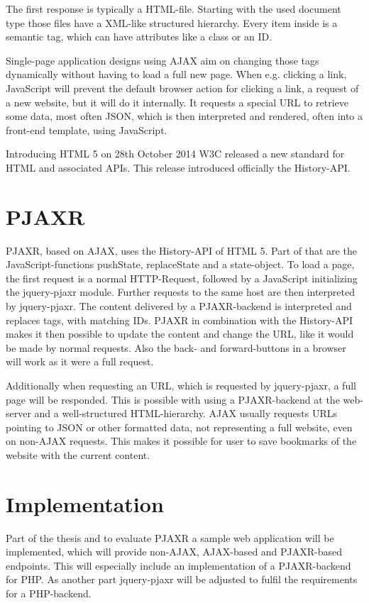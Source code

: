 \documentclass[f,bachelor,binding,twoside,palatino]{WeSTthesis}
\begin{document}
  The first response is typically a HTML-file.
  Starting with the used document type those files have a XML-like structured hierarchy.
  Every item inside is a semantic tag, which can have attributes like a class or an ID.

  Single-page application designs using AJAX aim on changing those tags dynamically without having to load a full new page.
  When e.g. clicking a link, JavaScript will prevent the default browser action for clicking a link, a request of a new website, but it will do it internally.
  It requests a special URL to retrieve some data, most often JSON, which is then interpreted and rendered, often into a front-end template, using JavaScript.

  Introducing HTML 5 on 28th October 2014 W3C released a new standard for HTML and associated APIs. 
  This release introduced officially the History-API.
  
\section{PJAXR}
  PJAXR, based on AJAX, uses the History-API of HTML 5.
  Part of that are the JavaScript-functions pushState, replaceState and a state-object.
  To load a page, the first request is a normal HTTP-Request, followed by a JavaScript initializing the jquery-pjaxr module.
  Further requests to the same host are then interpreted by jquery-pjaxr.
  The content delivered by a PJAXR-backend is interpreted and replaces tags, with matching IDs.
  PJAXR in combination with the History-API makes it then possible to update the content and change the URL, like it would be made by normal requests.
  Also the back- and forward-buttons in a browser will work as it were a full request.
  
  Additionally when requesting an URL, which is requested by jquery-pjaxr, a full page will be responded.
  This is possible with using a PJAXR-backend at the web-server and a well-structured HTML-hierarchy.
  AJAX usually requests URLs pointing to JSON or other formatted data, not representing a full website, even on non-AJAX requests.
  This makes it possible for user to save bookmarks of the website with the current content.

\section{Implementation}
  Part of the thesis and to evaluate PJAXR a sample web application will be implemented, which will provide non-AJAX, AJAX-based and PJAXR-based endpoints.
  This will especially include an implementation of a PJAXR-backend for PHP. As another part jquery-pjaxr will be adjusted to fulfil the requirements for a PHP-backend.
\end{document}
